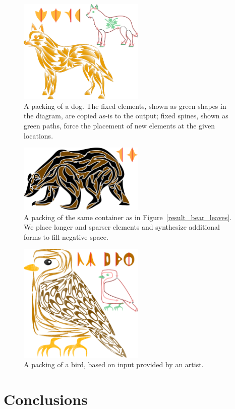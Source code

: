\begin{figure} %
\centering
\includegraphics[width=6cm]{figures/flowpak/dog_flower.pdf}
\caption{A packing of a dog. The fixed elements, shown as green
	shapes in the diagram, are copied as-is to the output; fixed spines,
	shown as green paths, force the placement of new elements at the given
	locations.}
\label{result_dog}
\end{figure}




\begin{figure} %
\centering
\includegraphics[width=6cm]{figures/flowpak/bear_offset_space.pdf}
\caption{A packing of the same container as in Figure~\ref{result_bear_leaves}.
	We place longer and sparser elements and synthesize additional forms to
	fill negative space.}
\label{result_bear_offset}
\end{figure}

\begin{figure} %
\centering
\includegraphics[width=6cm]{figures/flowpak/bird_square.pdf}
\caption{A packing of a bird, based on input provided by
	an artist.}
\label{bird_square}
\end{figure}

\section{Conclusions}

